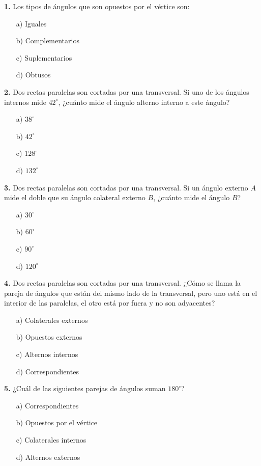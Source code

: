 \noindent\textbf{1.} Los tipos de ángulos que son opuestos por el vértice son:
\begin{itemize}
    \item[a)] Iguales
    \item[b)] Complementarios
    \item[c)] Suplementarios
    \item[d)] Obtusos
\end{itemize}

\noindent\textbf{2.} Dos rectas paralelas son cortadas por una transversal. Si uno de los ángulos internos mide $42^\circ$, ¿cuánto mide el ángulo alterno interno a este ángulo?
\begin{itemize}
    \item[a)] $38^\circ$
    \item[b)] $42^\circ$
    \item[c)] $128^\circ$
    \item[d)] $132^\circ$
\end{itemize}

\noindent\textbf{3.} Dos rectas paralelas son cortadas por una transversal. Si un ángulo externo $A$ mide el doble que su ángulo colateral externo $B$, ¿cuánto mide el ángulo $B$?
\begin{itemize}
    \item[a)] $30^\circ$
    \item[b)] $60^\circ$
    \item[c)] $90^\circ$
    \item[d)] $120^\circ$
\end{itemize}

\noindent\textbf{4.} Dos rectas paralelas son cortadas por una transversal. ¿Cómo se llama la pareja de ángulos que están del mismo lado de la transversal, pero uno está en el interior de las paralelas, el otro está por fuera y no son adyacentes?
\begin{itemize}
    \item[a)] Colaterales externos
    \item[b)] Opuestos externos
    \item[c)] Alternos internos
    \item[d)] Correspondientes
\end{itemize}

\noindent\textbf{5.} ¿Cuál de las siguientes parejas de ángulos suman $180^\circ$?
\begin{itemize}
    \item[a)] Correspondientes
    \item[b)] Opuestos por el vértice
    \item[c)] Colaterales internos
    \item[d)] Alternos externos
\end{itemize}

